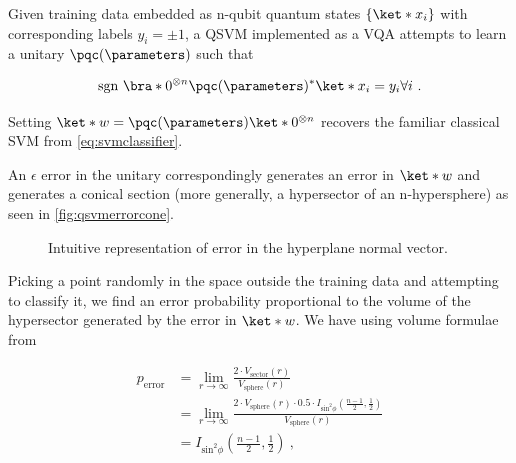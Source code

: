 
Given training data embedded as n-qubit quantum states \(\{\ket*{x_i}\}\) with
corresponding labels \({y_i = \pm 1}\), a QSVM implemented as a VQA attempts to learn a
unitary \(\pqc(\parameters)\) such that

\begin{equation}
    \text{sgn }{\bra*{0}^{\otimes n}\pqc(\parameters)^*\ket*{x_i}} = y_i \forall i~.
\end{equation}

Setting \(\ket*{w} = \pqc(\parameters)\ket*{0}^{\otimes n}\) recovers the
familiar classical SVM from \autoref{eq:svmclassifier}.

An \(\epsilon\) error in the unitary correspondingly generates an error in
\(\ket*{w}\) and generates a conical section (more generally, a hypersector of
an n-hypersphere) as seen in \autoref{fig:qsvmerrorcone}.

\begin{figure}[!ht]
    \centering
      \caption{Intuitive representation of error in the hyperplane normal vector.}
      \label{fig:qsvmerrorcone}
\end{figure}

Picking a point randomly in the space outside the training data and attempting
to classify it, we find an error probability proportional to the volume of the
hypersector generated by the error in \(\ket*{w}\). We have using volume
formulae from \cite{li2011concise}

\begin{align}
        p_{\text{error}} &= \lim_{r\to \infty}\frac{2\cdot V_{\text{sector}}(r)}{V_{\text{sphere}}(r)} \nonumber\\
            &= \lim_{r\to \infty}\frac{2\cdot V_{\text{sphere}}(r)\cdot 0.5\cdot I_{\text{sin}^2\phi}(\frac{n-1}{2}, \frac{1}{2})}{V_{\text{sphere}}(r)} \nonumber\\
            &= I_{\text{sin}^2\phi}(\frac{n-1}{2}, \frac{1}{2})~,
\end{align}

